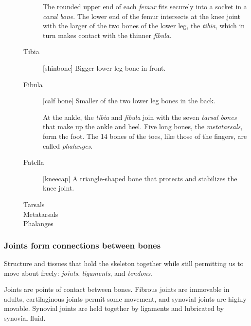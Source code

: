 \documentclass[11pt]{article}
\begin{document}
\begin{description}
\begin{description}
The rounded upper end of each \emph{femur} fits securely into a socket in
a \emph{coxal bone}. The lower end of the femur intersects at the knee
joint with the larger of the two bones of the lower leg, the \emph{tibia},
which in turn makes contact with the thinner \emph{fibula}.
\item[{Tibia}] [shinbone] Bigger lower leg bone in front.
\item[{Fibula}] [calf bone] Smaller of the two lower leg bones in the back.

At the ankle, the \emph{tibia} and \emph{fibula} join with the seven \emph{tarsal
bones} that make up the ankle and heel. Five long bones, the
\emph{metatarsals}, form the foot. The 14 bones of the toes, like those of
the fingers, are called \emph{phalanges}.
\item[{Patella}] [kneecap] A triangle-shaped bone that protects and stabilizes
the knee joint.
\item[{Tarsals}] 

\item[{Metatarsals}] 

\item[{Phalanges}] 
\end{description}
\end{description}
\subsubsection{Joints form connections between bones}
\label{sec:orge808f43}
Structure and tissues that hold the skeleton together while still permitting
us to move about freely: \emph{joints}, \emph{ligaments}, and \emph{tendons}.

Joints are points of contact between bones. Fibrous joints are immovable in
adults, cartilaginous joints permit some movement, and synovial joints are
highly movable. Synovial joints are held together by ligaments and
lubricated by synovial fluid.
\end{document}
